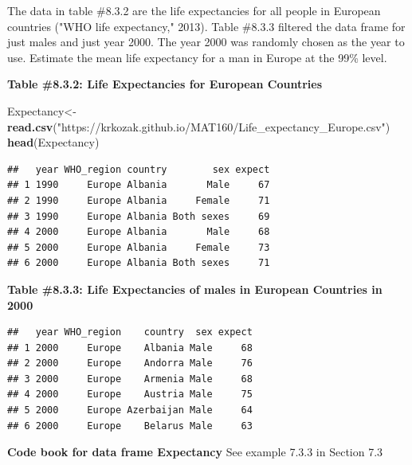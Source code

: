 \documentclass[]{book}
\newenvironment{Shaded}{\begin{snugshade}}{\end{snugshade}}
\newcommand{\KeywordTok}[1]{\textcolor[rgb]{0.13,0.29,0.53}{\textbf{#1}}}
\newcommand{\NormalTok}[1]{#1}
\newcommand{\OperatorTok}[1]{\textcolor[rgb]{0.81,0.36,0.00}{\textbf{#1}}}
\newcommand{\StringTok}[1]{\textcolor[rgb]{0.31,0.60,0.02}{#1}}
\begin{document}
The data in table \#8.3.2 are the life expectancies for all people in European countries ("WHO life expectancy," 2013). Table \#8.3.3 filtered the data frame for just males and just year 2000. The year 2000 was randomly chosen as the year to use. Estimate the mean life expectancy for a man in Europe at the 99\% level.

\textbf{Table \#8.3.2: Life Expectancies for European Countries}

\begin{Shaded}
\begin{Highlighting}[]
\NormalTok{Expectancy<-}\KeywordTok{read.csv}\NormalTok{(}\StringTok{"https://krkozak.github.io/MAT160/Life_expectancy_Europe.csv"}\NormalTok{)}
\KeywordTok{head}\NormalTok{(Expectancy)}
\end{Highlighting}
\end{Shaded}

\begin{verbatim}
##   year WHO_region country        sex expect
## 1 1990     Europe Albania       Male     67
## 2 1990     Europe Albania     Female     71
## 3 1990     Europe Albania Both sexes     69
## 4 2000     Europe Albania       Male     68
## 5 2000     Europe Albania     Female     73
## 6 2000     Europe Albania Both sexes     71
\end{verbatim}

\textbf{Table \#8.3.3: Life Expectancies of males in European Countries in 2000}

\begin{Shaded}
\end{Shaded}

\begin{verbatim}
##   year WHO_region    country  sex expect
## 1 2000     Europe    Albania Male     68
## 2 2000     Europe    Andorra Male     76
## 3 2000     Europe    Armenia Male     68
## 4 2000     Europe    Austria Male     75
## 5 2000     Europe Azerbaijan Male     64
## 6 2000     Europe    Belarus Male     63
\end{verbatim}

\textbf{Code book for data frame Expectancy} See example 7.3.3 in Section 7.3
\end{document}
